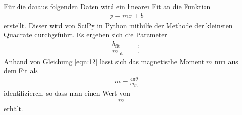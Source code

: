 Für die daraus folgenden Daten wird ein linearer Fit an die Funktion
\begin{align*}
  y = m x + b
\end{align*}
erstellt.
Dieser wird von SciPy in Python mithilfe der Methode der kleinsten Quadrate durchgeführt.
Es ergeben sich die Parameter
\begin{align*}
  b_{\text{fit}} &= ,\\
  m_{\text{fit}} &= .
\end{align*}
Anhand von Gleichung \eqref{eqn:12} lässt sich das magnetische Moment $m$ nun aus dem Fit als
\begin{align}
  m = \frac{4 \pi \theta}{m_{\text{fit}}}
\end{align}
identifizieren, so dass man einen Wert von
\begin{align*}
  m &= 
\end{align*}
erhält.

